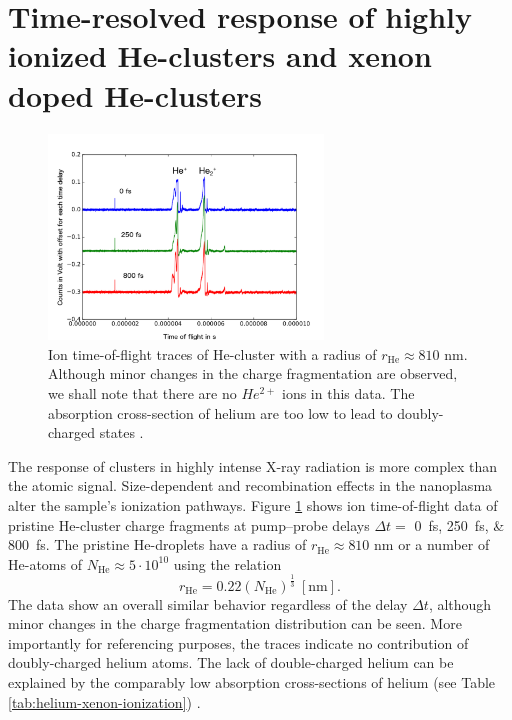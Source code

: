 \section[Time-resolved response of highly ionized He- and HeXe-clusters]{Time-resolved response of highly ionized He-clusters and xenon doped He-clusters}\label{sec:hexe--and-he-TOF}
\begin{figure}
	\centering
		\includegraphics[width=0.65\textwidth]{images/results/TOF-helium-cluster.png}
	\caption[Time-resolved answer of He-clusters in TOF spectroscopy.]{Ion time-of-flight traces of He-cluster with a radius of $r_{\text{He}}\approx 810$ nm. Although minor changes in the charge fragmentation are observed, we shall note that there are no $He^{2+}$ ions in this data. The absorption cross-section of helium are too low to lead to doubly-charged states \citep{Ho-2016-PC}.}
	\label{fig:TOF-helium-cluster}
\end{figure}
The response of clusters in highly intense X-ray radiation is more complex than the atomic signal. Size-dependent \citep{Schorb-2012-PRL,Schutte-2015-JPhysB} and recombination effects in the nanoplasma \citep{Schutte-2014-PRL} alter the sample's ionization pathways. Figure \ref{fig:TOF-helium-cluster} shows ion time-of-flight data of pristine He-cluster charge fragments at pump--probe delays $\Delta t=$ \SIlist{0;250;800}{\femto\second}. The pristine He-droplets have a radius of $r_{\text{He}}\approx 810$ nm or a number of He-atoms of $N_{\text{He}}\approx 5\cdot 10^{10}$ using the relation \citep{Gomez-2011-JCP}
\begin{equation}
r_{\text{He}}=0.22 (N_{\text{He}})^{\frac{1}{3}}\ [\text{nm}].
\end{equation}
The data show an overall similar behavior regardless of the delay $\Delta t$, although minor changes in the charge fragmentation distribution can be seen. More importantly for referencing purposes, the traces indicate no contribution of doubly-charged helium atoms. The lack of double-charged helium can be explained by the comparably low absorption cross-sections of helium (see Table \ref{tab:helium-xenon-ionization}) \citep{Ho-2016-PC}.\\[1\baselineskip]
